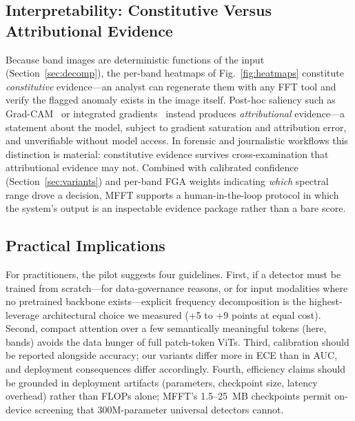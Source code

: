 \documentclass[journal]{IEEEtran}
\begin{document}
\subsection{Interpretability: Constitutive Versus Attributional Evidence}
Because band images are deterministic functions of the input (Section~\ref{sec:decomp}), the per-band heatmaps of Fig.~\ref{fig:heatmaps} constitute \emph{constitutive} evidence---an analyst can regenerate them with any FFT tool and verify the flagged anomaly exists in the image itself. Post-hoc saliency such as Grad-CAM~\cite{selvaraju2017} or integrated gradients~\cite{sundararajan2017} instead produces \emph{attributional} evidence---a statement about the model, subject to gradient saturation and attribution error, and unverifiable without model access. In forensic and journalistic workflows this distinction is material: constitutive evidence survives cross-examination that attributional evidence may not. Combined with calibrated confidence (Section~\ref{sec:variants}) and per-band FGA weights indicating \emph{which} spectral range drove a decision, MFFT supports a human-in-the-loop protocol in which the system's output is an inspectable evidence package rather than a bare score.

\subsection{Practical Implications}
For practitioners, the pilot suggests four guidelines. First, if a detector must be trained from scratch---for data-governance reasons, or for input modalities where no pretrained backbone exists---explicit frequency decomposition is the highest-leverage architectural choice we measured (+5 to +9 points at equal cost). Second, compact attention over a few semantically meaningful tokens (here, bands) avoids the data hunger of full patch-token ViTs. Third, calibration should be reported alongside accuracy; our variants differ more in ECE than in AUC, and deployment consequences differ accordingly. Fourth, efficiency claims should be grounded in deployment artifacts (parameters, checkpoint size, latency overhead) rather than FLOPs alone; MFFT's 1.5--25~MB checkpoints permit on-device screening that 300M-parameter universal detectors cannot.

\end{document}
